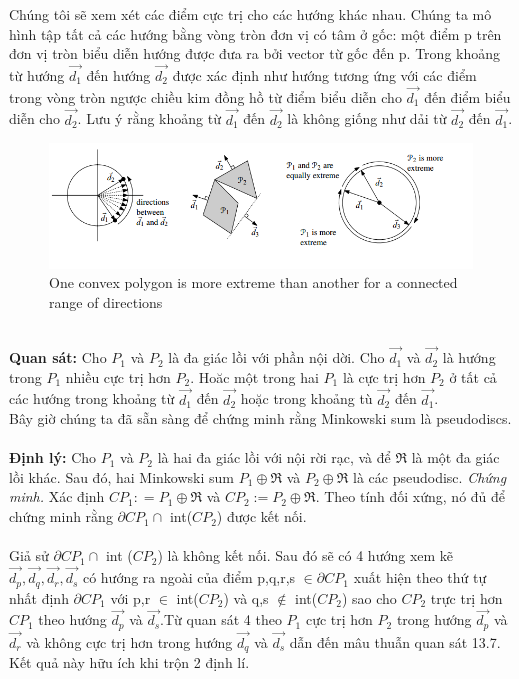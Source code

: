 \documentclass[a4paper,12pt]{report}
\begin{document}
Chúng tôi sẽ xem xét các điểm cực trị cho các hướng khác nhau. Chúng ta mô hình tập tất cả các hướng bằng vòng tròn đơn vị có tâm ở gốc: một điểm p trên đơn vị tròn biểu diễn hướng được đưa ra bởi vector từ gốc đến p. Trong khoảng từ hướng $\overrightarrow{d_1}$ đến hướng $\overrightarrow{d_2}$ được xác định như hướng tương ứng với các điểm trong vòng tròn ngược chiều kim đồng hồ từ điểm biểu diễn cho $\overrightarrow{d_1}$ đến điểm biểu diễn cho $\overrightarrow{d_2}$. Lưu ý rằng khoảng từ $\overrightarrow{d_1}$ đến $\overrightarrow{d_2}$ là không giống như dải từ $\overrightarrow{d_2}$ đến $\overrightarrow{d_1}$. 
\begin{figure}[h]
\begin{center}
\includegraphics[width=0.9\linewidth]{7.png}
\caption{One convex polygon is more extreme
than another for a connected range of
directions}
\end{center}
\end{figure} \\
\textbf{Quan sát: } Cho $P_1$ và $P_2$ là đa giác lồi với phần nội dời. Cho $\overrightarrow{d_1}$ và $\overrightarrow{d_2}$ là hướng trong $P_1$ nhiều cực trị hơn $P_2$. Hoăc một trong hai $P_1$ là cực trị hơn $P_2$ ở tất cả các hướng trong khoảng từ $\overrightarrow{d_1}$ đến $\overrightarrow{d_2}$ hoặc trong khoảng tù $\overrightarrow{d_2}$ đến $\overrightarrow{d_1}$. \\ 
Bây giờ chúng ta đã sẵn sàng để chứng minh rằng Minkowski sum là pseudodiscs.\\ \\
\textbf{Định lý:} Cho $P_1$ và $P_2$ là hai đa giác lồi với nội rời rạc, và để $\Re$ là một đa giác lồi khác. Sau đó, hai Minkowski sum  $P_1 \oplus \Re$ và $P_2 \oplus \Re$ là các pseudodisc.
\textit{Chứng minh.} Xác định $CP_1: = P_1 \oplus \Re$ và $CP_2 := P_2 \oplus \Re$. Theo tính đối xứng, nó đủ để chứng minh rằng $\partial CP_1 \cap $ int($CP_2$) được kết nối. \\ \\
Giả sử $\partial CP_1 \cap$ int ($CP_2$) là không kết nối. Sau đó sẽ có 4 hướng xem kẽ $\overrightarrow{d_p}, \overrightarrow{d_q},\overrightarrow{d_r},\overrightarrow{d_s}$ có hướng ra ngoài của điểm p,q,r,s $\in \partial CP_1$ xuất hiện  theo thứ tự nhất định $\partial CP_1$ với p,r $\in$ int($CP_2$) và q,s $\notin$ int($CP_2$) sao cho $CP_2$  trực trị hơn $CP_1$ theo hướng $\overrightarrow{d_p}$ và $\overrightarrow{d_s}$.Từ quan sát 4 theo $P_1$ cực trị hơn $P_2$ trong hướng $\overrightarrow{d_p}$ và $\overrightarrow{d_r}$ và không cực trị hơn trong hướng $\overrightarrow{d_q}$ và $\overrightarrow{d_s}$ dẫn đến mâu thuẫn quan sát 13.7. Kết quả này hữu ích khi trộn 2 định lí. \\
\end{document}
